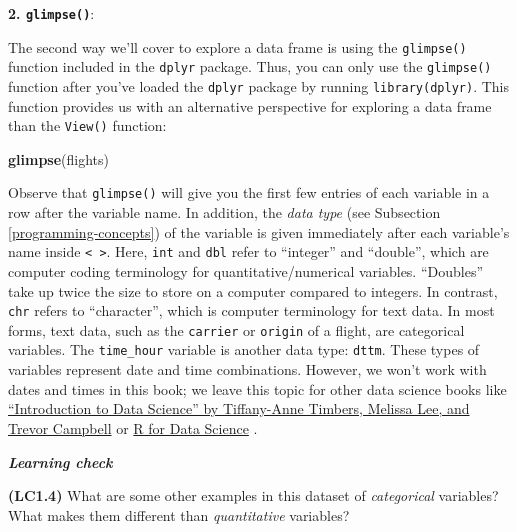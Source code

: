 \documentclass[]{book}
\newenvironment{Shaded}{\begin{snugshade}}{\end{snugshade}}
\newcommand{\KeywordTok}[1]{\textcolor[rgb]{0.13,0.29,0.53}{\textbf{#1}}}
\newcommand{\NormalTok}[1]{#1}
\begin{document}
\textbf{2. \texttt{glimpse()}}:

The second way we'll cover to explore a data frame is using the \texttt{glimpse()} function  included in the  \texttt{dplyr} package. Thus, you can only use the \texttt{glimpse()} function after you've loaded the \texttt{dplyr} package by running \texttt{library(dplyr)}. This function provides us with an alternative perspective for exploring a data frame than the \texttt{View()} function:

\begin{Shaded}
\begin{Highlighting}[]
\KeywordTok{glimpse}\NormalTok{(flights)}
\end{Highlighting}
\end{Shaded}

Observe that \texttt{glimpse()} will give you the first few entries of each variable in a row after the variable name. In addition, the \emph{data type} (see Subsection \ref{programming-concepts}) of the variable is given immediately after each variable's name inside \texttt{\textless{}\ \textgreater{}}. Here, \texttt{int} and \texttt{dbl} refer to ``integer'' and ``double'', which are computer coding terminology for quantitative/numerical variables. ``Doubles'' take up twice the size to store on a computer compared to integers. In contrast, \texttt{chr} refers to ``character'', which is computer terminology for text data. In most forms, text data, such as the \texttt{carrier} or \texttt{origin} of a flight, are categorical variables. The \texttt{time\_hour} variable is another data type: \texttt{dttm}. These types of variables represent date and time combinations. However, we won't work with dates and times in this book; we leave this topic for other data science books like \href{https://ubc-dsci.github.io/introduction-to-datascience/}{``Introduction to Data Science'' by Tiffany-Anne Timbers, Melissa Lee, and Trevor Campbell} or \href{https://r4ds.had.co.nz/dates-and-times.html}{R for Data Science} \citep{rds2016}.

\begin{learncheck}
\vspace{-0.25in}

\textbf{\emph{Learning check}} \vspace{-0.25in}
\end{learncheck}

\textbf{(LC1.4)} What are some other examples in this dataset of \emph{categorical} variables? What makes them different than \emph{quantitative} variables?
\end{document}
